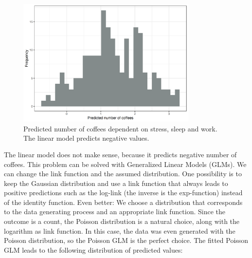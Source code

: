 \documentclass[
  11pt,
]{scrbook}
\begin{document}
\begin{figure}

{\centering \includegraphics[width=0.8\textwidth]{images/failing-linear-model-1} 

}

\caption{Predicted number of coffees dependent on stress, sleep and work. The linear model predicts negative values.}\label{fig:failing-linear-model}
\end{figure}

The linear model does not make sense, because it predicts negative number of coffees.
This problem can be solved with Generalized Linear Models (GLMs).
We can change the link function and the assumed distribution.
One possibility is to keep the Gaussian distribution and use a link function that always leads to positive predictions such as the log-link (the inverse is the exp-function) instead of the identity function.
Even better:
We choose a distribution that corresponds to the data generating process and an appropriate link function.
Since the outcome is a count, the Poisson distribution is a natural choice, along with the logarithm as link function.
In this case, the data was even generated with the Poisson distribution, so the Poisson GLM is the perfect choice.
The fitted Poisson GLM leads to the following distribution of predicted values:
\end{document}
